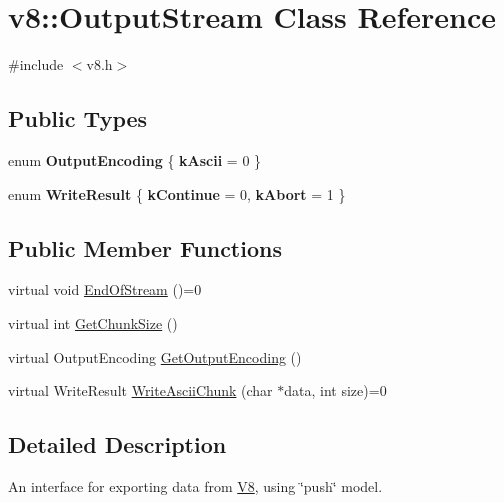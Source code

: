 \hypertarget{classv8_1_1_output_stream}{}\section{v8\+:\+:Output\+Stream Class Reference}
\label{classv8_1_1_output_stream}


{\ttfamily \#include $<$v8.\+h$>$}

\subsection*{Public Types}
\begin{DoxyCompactItemize}
\item 
\hypertarget{classv8_1_1_output_stream_a73e16718962e5c852c9341aed01c96cd}{}enum {\bfseries Output\+Encoding} \{ {\bfseries k\+Ascii} = 0
 \}\label{classv8_1_1_output_stream_a73e16718962e5c852c9341aed01c96cd}

\item 
\hypertarget{classv8_1_1_output_stream_a336c7605a0ce4fbe6f6fca3b03bc16de}{}enum {\bfseries Write\+Result} \{ {\bfseries k\+Continue} = 0, 
{\bfseries k\+Abort} = 1
 \}\label{classv8_1_1_output_stream_a336c7605a0ce4fbe6f6fca3b03bc16de}

\end{DoxyCompactItemize}
\subsection*{Public Member Functions}
\begin{DoxyCompactItemize}
\item 
virtual void \hyperlink{classv8_1_1_output_stream_a6c5c308367fc5776bcbedff0e94d6049}{End\+Of\+Stream} ()=0
\item 
virtual int \hyperlink{classv8_1_1_output_stream_a93bdaa790cbd66a7283fad2cca3f48f7}{Get\+Chunk\+Size} ()
\item 
virtual Output\+Encoding \hyperlink{classv8_1_1_output_stream_ae64c7719c109c5a7404caf4f311dc32d}{Get\+Output\+Encoding} ()
\item 
virtual Write\+Result \hyperlink{classv8_1_1_output_stream_a42adc62ebe43d00159f80328538f217f}{Write\+Ascii\+Chunk} (char $\ast$data, int size)=0
\end{DoxyCompactItemize}


\subsection{Detailed Description}
An interface for exporting data from \hyperlink{classv8_1_1_v8}{V8}, using \char`\"{}push\char`\"{} model. 

